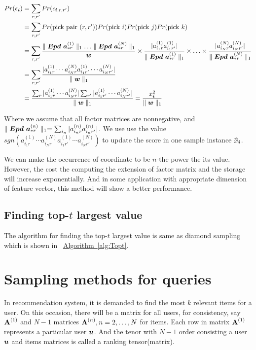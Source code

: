 \documentclass{article}
\newcommand{\Sca}[3]{{#1}^{(#2)}_{i_#2#3}}%
\newcommand{\V}[1]{{\bm{{\MakeLowercase{#1}}}}}
\newcommand{\Vacol}[1]{\V{a}^{(#1)}_{*r}}
\newcommand{\M}[1]{{\bm{\mathbf{\MakeUppercase{#1}}}}}
\newcommand{\norm}[2]{\parallel#1\parallel_{#2}}
\newcommand{\Alg}[1] {\hyperref[alg:#1] {Algorithm~\ref*{alg:#1}}}
\begin{document}
\begin{align*}
Pr(\epsilon_{\V{i}}) &= \sum_{r,r'} Pr(\epsilon_{\V{i},r,r'})\\
&= \sum_{r,r'} Pr({\rm pick\ pair\ }(r,r'))Pr({\rm pick\ }i)Pr({\rm pick\ }j)Pr({\rm pick\ }k)\\
&= \sum_{r,r'} \frac{\norm{\bm{Epd}\ \Vacol{1}}{1}\ldots\norm{\bm{Epd}\ \Vacol{N}}{1}}{\V{w}}\times
\frac{|\Sca{a}{1}{r}\Sca{a}{1}{r'}|}{\norm{\bm{Epd}\ \Vacol{1}}{1}} \times\ldots\times
\frac{|\Sca{a}{N}{r}\Sca{a}{N}{r'}|}{\norm{\bm{Epd}\ \Vacol{N}}{1}} \\
& = \sum_{r,r'} \frac{|\Sca{a}{1}{r}\cdots\Sca{a}{N}{r}\Sca{a}{1}{r'}\cdots\Sca{a}{N}{r'}|}{\norm{\V{W}}{1}}\\
& = \frac{\sum_{r}|\Sca{a}{1}{r}\cdots\Sca{a}{N}{r}|\sum_{r'} |\Sca{a}{1}{r'}\cdots\Sca{a}{N}{r'}|}{\norm{\V{W}}{1}} = \frac{x_{\V{i}}^2}{\norm{\V{w}}{1}}
\end{align*}

Where we assume that all factor matrices are nonnegative, and $\norm{\bm{Epd}\ \Vacol{n}}{1} = \sum_{i_n}|\Sca{a}{n}{r}\Sca{a}{n}{r'}|$. We use use the value $sgn(\Sca{a}{1}{r}\cdots\Sca{a}{N}{r}\Sca{a}{1}{r'}\cdots\Sca{a}{N}{r'})$ to update the score in one sample instance $\widehat{x}_{\V{i}}$.

We can make the occurrence of coordinate to be $n$-the power the its value. However, the cost the computing the extension of factor matrix and the storage will increase exponentially. And in some application with appropriate dimension of feature vector, this method will show a better performance.


\subsection{Finding top-$t$ largest value}

The algorithm for finding the top-$t$ largest value is same as diamond sampling which is shown in ~\Alg{Topt}.


\section{Sampling methods for queries}

In recommendation system, it is demanded to find the most $k$ relevant items for a user. On this occasion, there will be a matrix for all users, for consistency, say $\M{A}^{(1)}$ and $N-1$ matrices $\M{A}^{(n)},n=2,\ldots,N$ for items. Each row in matrix $\M{A}^{(1)}$ represents a particular user $\V{u}$. And the tenor with $N-1$ order consisting a user $\V{u}$ and items matrices is called a ranking tensor(matrix).
\end{document}
